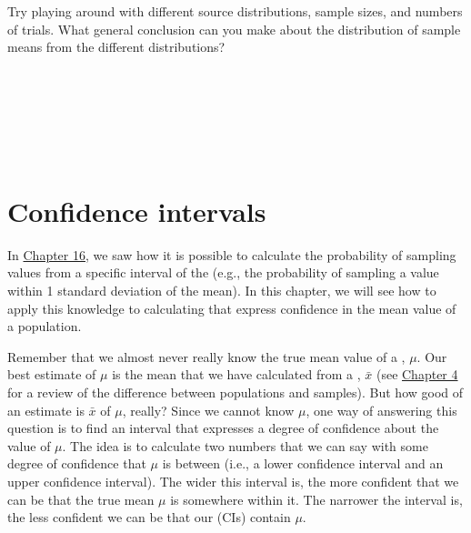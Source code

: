 \documentclass[
  openany]{krantz}
\begin{document}
\begin{verbatim}






\end{verbatim}

Try playing around with different source distributions, sample sizes, and numbers of trials.
What general conclusion can you make about the distribution of sample means from the different distributions?

\begin{verbatim}






\end{verbatim}

\hypertarget{Chapter_18}{%
\chapter{Confidence intervals}\label{Chapter_18}}

In \protect\hyperlink{Chapter_16}{Chapter 16}, we saw how it is possible to calculate the probability of sampling values from a specific interval of the  (e.g., the probability of sampling a value within 1 standard deviation of the mean).
In this chapter, we will see how to apply this knowledge to calculating  that express confidence in the mean value of a population.

Remember that we almost never really know the true mean value of a \emph{}, \(\mu\).
Our best estimate of \(\mu\) is the mean that we have calculated from a \emph{}, \(\bar{x}\) (see \protect\hyperlink{Chapter_4}{Chapter 4} for a review of the difference between populations and samples).
But how good of an estimate is \(\bar{x}\) of \(\mu\), really?
Since we cannot know \(\mu\), one way of answering this question is to find an interval that expresses a degree of confidence about the value of \(\mu\).
The idea is to calculate two numbers that we can say with some degree of confidence that \(\mu\) is between (i.e., a lower confidence interval and an upper confidence interval).
The wider this interval is, the more confident that we can be that the true mean \(\mu\) is somewhere within it.
The narrower the interval is, the less confident we can be that our  (CIs) contain \(\mu\).
\end{document}
